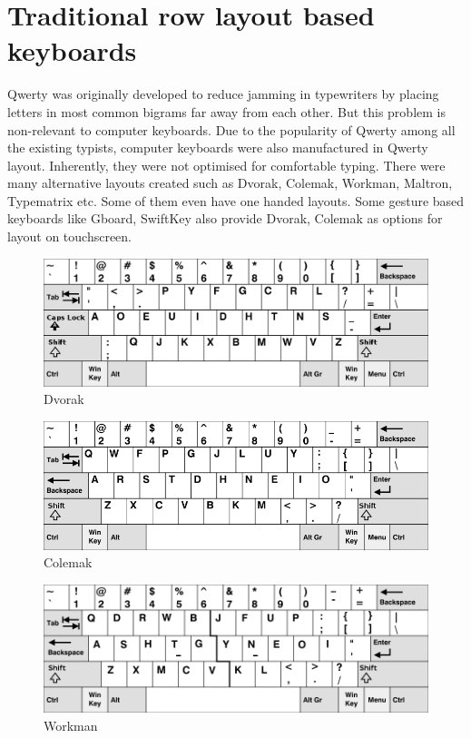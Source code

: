 \documentclass[MTech]{iitmdiss}
\begin{document}
\section{Traditional row layout based keyboards}
Qwerty was originally developed to reduce jamming in typewriters by placing letters in most common bigrams far away from each other. But this problem is non-relevant to computer keyboards. Due to the popularity of Qwerty among all the existing typists, computer keyboards were also manufactured in Qwerty layout. Inherently, they were not optimised for comfortable typing. There were many alternative layouts created such as Dvorak, Colemak, Workman, Maltron, Typematrix etc. Some of them even have one handed layouts. Some gesture based keyboards like Gboard, SwiftKey also provide Dvorak, Colemak as options for layout on touchscreen. 

\begin{figure}[h!]
	\centering
	\includegraphics[scale=0.35]{Images/dvorak}
	\caption{Dvorak}
\end{figure}

\begin{figure}[h!]
	\centering
	\includegraphics[scale=0.525]{Images/colemak}
	\caption{Colemak}
\end{figure}

\begin{figure}[h!]
	\centering
	\includegraphics[scale=0.47]{Images/workman}
	\caption{Workman}
\end{figure}
\end{document}
